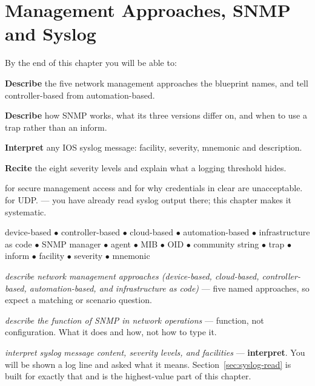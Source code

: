 \chapter{Management Approaches, SNMP and Syslog}\label{ch:management}

\begin{outcomes}
By the end of this chapter you will be able to:
\begin{tight}
  \item \textbf{Describe} the five network management approaches the blueprint
        names, and tell controller-based from automation-based.
  \item \textbf{Describe} how SNMP works, what its three versions differ on, and
        when to use a trap rather than an inform.
  \item \textbf{Interpret} any IOS syslog message: facility, severity, mnemonic
        and description.
  \item \textbf{Recite} the eight severity levels and explain what a logging
        threshold hides.
\end{tight}
\end{outcomes}

\begin{prereq}
 for secure management access and for why credentials in clear are
unacceptable.  for UDP.  --- you have already
read syslog output there; this chapter makes it systematic.
\end{prereq}

\begin{keyterms}
device-based $\bullet$ controller-based $\bullet$ cloud-based $\bullet$
automation-based $\bullet$ infrastructure as code $\bullet$ SNMP manager
$\bullet$ agent $\bullet$ MIB $\bullet$ OID $\bullet$ community string $\bullet$
trap $\bullet$ inform $\bullet$ facility $\bullet$ severity $\bullet$ mnemonic
\end{keyterms}

\begin{examnote}
 \emph{describe network management approaches (device-based,
cloud-based, controller-based, automation-based, and infrastructure as code)} ---
five named approaches, so expect a matching or scenario question.

 \emph{describe the function of SNMP in network operations} --- function,
not configuration. What it does and how, not how to type it.

 \emph{interpret syslog message content, severity levels, and facilities}
--- \textbf{interpret}. You will be shown a log line and asked what it means.
Section~\ref{sec:syslog-read} is built for exactly that and is the highest-value part of this
chapter.
\end{examnote}

